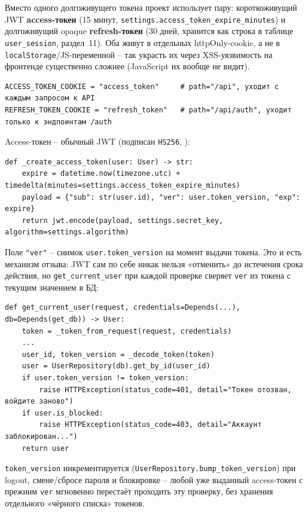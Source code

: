 Вместо одного долгоживущего токена проект использует пару: короткоживущий
JWT \textbf{access-токен} (15 минут, \texttt{settings.access_token_expire_minutes})
и долгоживущий opaque \textbf{refresh-токен} (30 дней,
хранится как строка в таблице \texttt{user\_session}, раздел~11). Оба живут в
отдельных httpOnly-cookie, а не в \texttt{localStorage}/JS-переменной --
так украсть их через XSS-уязвимость на фронтенде существенно сложнее
(JavaScript их вообще не видит).
\begin{verbatim}
ACCESS_TOKEN_COOKIE = "access_token"     # path="/api", уходит с каждым запросом к API
REFRESH_TOKEN_COOKIE = "refresh_token"   # path="/api/auth", уходит только к эндпоинтам /auth
\end{verbatim}
Access-токен -- обычный JWT (подписан \texttt{HS256},
):
\begin{verbatim}
def _create_access_token(user: User) -> str:
    expire = datetime.now(timezone.utc) + timedelta(minutes=settings.access_token_expire_minutes)
    payload = {"sub": str(user.id), "ver": user.token_version, "exp": expire}
    return jwt.encode(payload, settings.secret_key, algorithm=settings.algorithm)
\end{verbatim}
Поле \texttt{"ver"} -- снимок \texttt{user.token_version} на момент
выдачи токена. Это и есть механизм отзыва: JWT сам по себе никак нельзя
«отменить» до истечения срока действия, но \texttt{get_current_user}
при каждой проверке сверяет \texttt{ver} из токена с текущим значением в
БД:
\begin{verbatim}
def get_current_user(request, credentials=Depends(...), db=Depends(get_db)) -> User:
    token = _token_from_request(request, credentials)
    ...
    user_id, token_version = _decode_token(token)
    user = UserRepository(db).get_by_id(user_id)
    if user.token_version != token_version:
        raise HTTPException(status_code=401, detail="Токен отозван, войдите заново")
    if user.is_blocked:
        raise HTTPException(status_code=403, detail="Аккаунт заблокирован...")
    return user
\end{verbatim}
\texttt{token_version} инкрементируется (\texttt{UserRepository.bump_token_version})
при logout, смене/сбросе пароля и блокировке -- любой уже выданный
access-токен с прежним \texttt{ver} мгновенно перестаёт проходить эту
проверку, без хранения отдельного «чёрного списка» токенов.

